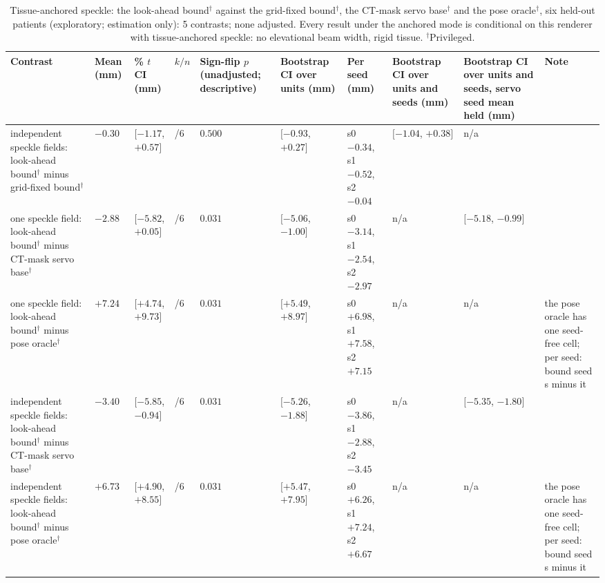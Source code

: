 
\begin{table}[tp]
\renewcommand{\baselinestretch}{1}\scriptsize
\caption{Tissue-anchored speckle: the look-ahead bound$^{\dagger}$ against the grid-fixed bound$^{\dagger}$, the CT-mask servo base$^{\dagger}$ and the pose oracle$^{\dagger}$, six held-out patients (exploratory; estimation only): 5 contrasts; none adjusted. Every result under the anchored mode is conditional on this renderer with tissue-anchored speckle: no elevational beam width, rigid tissue. $^{\dagger}$Privileged.}
\label{tab:est-g2-contrasts}
\centering
\setlength{\tabcolsep}{3pt}
\begin{tabularx}{\textwidth}{@{}>{\raggedright\arraybackslash\hsize=1.9355\hsize}X >{\raggedright\arraybackslash\hsize=0.5645\hsize}X >{\raggedright\arraybackslash\hsize=0.8065\hsize}X >{\raggedright\arraybackslash\hsize=0.4839\hsize}X >{\raggedright\arraybackslash\hsize=0.7258\hsize}X >{\raggedright\arraybackslash\hsize=0.8065\hsize}X >{\raggedright\arraybackslash\hsize=1.6129\hsize}X >{\raggedright\arraybackslash\hsize=0.8065\hsize}X >{\raggedright\arraybackslash\hsize=0.8065\hsize}X >{\raggedright\arraybackslash\hsize=1.4514\hsize}X @{}}
\toprule
Contrast & Mean (mm) & 95\% $t$ CI (mm) & $k/n$ & Sign-flip $p$ (unadjusted; descriptive) & Bootstrap CI over units (mm) & Per seed (mm) & Bootstrap CI over units and seeds (mm) & Bootstrap CI over units and seeds, servo seed mean held (mm) & Note \\
\midrule
independent speckle fields: look-ahead bound$^{\dagger}$ minus grid-fixed bound$^{\dagger}$ & $-0.30$ & $[-1.17$, $+0.57]$ & 2/6 & $0.500$ & $[-0.93$, $+0.27]$ & s0 $-0.34$, s1 $-0.52$, s2 $-0.04$ & $[-1.04$, $+0.38]$ & n/a &  \\
one speckle field: look-ahead bound$^{\dagger}$ minus CT-mask servo base$^{\dagger}$ & $-2.88$ & $[-5.82$, $+0.05]$ & 6/6 & $0.031$ & $[-5.06$, $-1.00]$ & s0 $-3.14$, s1 $-2.54$, s2 $-2.97$ & n/a & $[-5.18$, $-0.99]$ &  \\
one speckle field: look-ahead bound$^{\dagger}$ minus pose oracle$^{\dagger}$ & $+7.24$ & $[+4.74$, $+9.73]$ & 6/6 & $0.031$ & $[+5.49$, $+8.97]$ & s0 $+6.98$, s1 $+7.58$, s2 $+7.15$ & n/a & n/a & the pose oracle has one seed-free cell; per seed: bound seed s minus it \\
independent speckle fields: look-ahead bound$^{\dagger}$ minus CT-mask servo base$^{\dagger}$ & $-3.40$ & $[-5.85$, $-0.94]$ & 6/6 & $0.031$ & $[-5.26$, $-1.88]$ & s0 $-3.86$, s1 $-2.88$, s2 $-3.45$ & n/a & $[-5.35$, $-1.80]$ &  \\
independent speckle fields: look-ahead bound$^{\dagger}$ minus pose oracle$^{\dagger}$ & $+6.73$ & $[+4.90$, $+8.55]$ & 6/6 & $0.031$ & $[+5.47$, $+7.95]$ & s0 $+6.26$, s1 $+7.24$, s2 $+6.67$ & n/a & n/a & the pose oracle has one seed-free cell; per seed: bound seed s minus it \\
\bottomrule
\end{tabularx}
\end{table}
